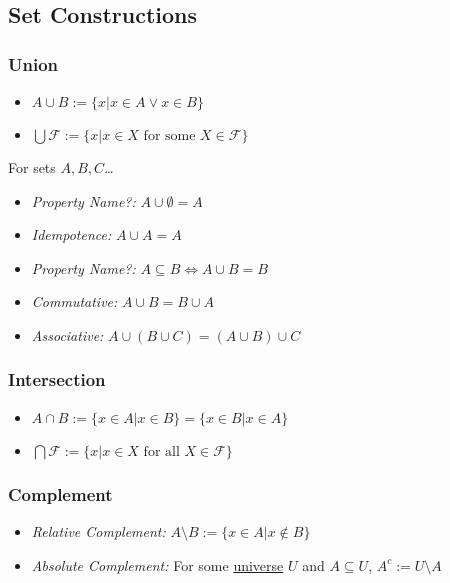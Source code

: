 \subsection{Set Constructions}\label{setconstructions}

\subsubsection{Union}\label{union}
\begin{itemize}
  \item $A\cup B := \{x | x \in A \lor x \in B \}$
  \item $\bigcup \mathcal{F} := \{x | x \in X \textrm{ for some } X \in \mathcal{F} \}$
\end{itemize}

\begin{proposition}
For sets $A,B,C$\dots
\begin{itemize}
  \item \emph{Property Name?:} $A \cup \emptyset = A$
  \item \emph{Idempotence:} $A\cup A = A$
  \item \emph{Property Name?:} $A \subseteq B \Leftrightarrow A \cup B = B$
  \item \emph{Commutative:} $A \cup B = B \cup A$
  \item \emph{Associative:} $A \cup (B \cup C) = (A \cup B) \cup C$
\end{itemize}
\end{proposition}
	
\subsubsection{Intersection}\label{intersection}
\begin{itemize}
  \item $A\cap B := \{x \in A | x \in B\} = \{x \in B | x \in A\}$
  \item $\bigcap \mathcal{F} := \{x | x \in X \textrm{ for all } X \in \mathcal{F} \}$
\end{itemize}

\subsubsection{Complement}\label{complement}
\begin{itemize}
  \item \emph{Relative Complement:} $A \ensuremath{\setminus} B := \{x \in A | x \not\in B \}$
  \item \emph{Absolute Complement:} For some \hyperref[universe]{universe} $U$ and $A \subseteq U$, $A^{c} := U \ensuremath{\setminus} A$
\end{itemize}
	
